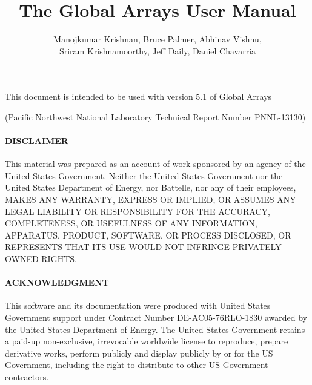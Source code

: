 \documentclass[oneside,english]{book}
\begin{document}
\title{The Global Arrays User Manual}

\author{Manojkumar Krishnan, Bruce Palmer, Abhinav Vishnu, \\
Sriram Krishnamoorthy, Jeff Daily, Daniel Chavarria}

\maketitle
\begin{center}
This document is intended to be used with version 5.1 of Global Arrays
\par\end{center}

\begin{center}
(Pacific Northwest National Laboratory Technical Report Number PNNL-13130)
\par\end{center}

\paragraph{DISCLAIMER}

This material was prepared as an account of work sponsored by an agency of the
United States Government. Neither the United States Government nor the United
States Department of Energy, nor Battelle, nor any of their employees, MAKES
ANY WARRANTY, EXPRESS OR IMPLIED, OR ASSUMES ANY LEGAL LIABILITY OR
RESPONSIBILITY FOR THE ACCURACY, COMPLETENESS, OR USEFULNESS OF ANY
INFORMATION, APPARATUS, PRODUCT, SOFTWARE, OR PROCESS DISCLOSED, OR REPRESENTS
THAT ITS USE WOULD NOT INFRINGE PRIVATELY OWNED RIGHTS. 

\paragraph{ACKNOWLEDGMENT}

This software and its documentation were produced with United States Government
support under Contract Number DE-AC05-76RLO-1830 awarded by the United States
Department of Energy. The United States Government retains a paid-up
non-exclusive, irrevocable worldwide license to reproduce, prepare derivative
works, perform publicly and display publicly by or for the US Government,
including the right to distribute to other US Government contractors. 
\end{document}

